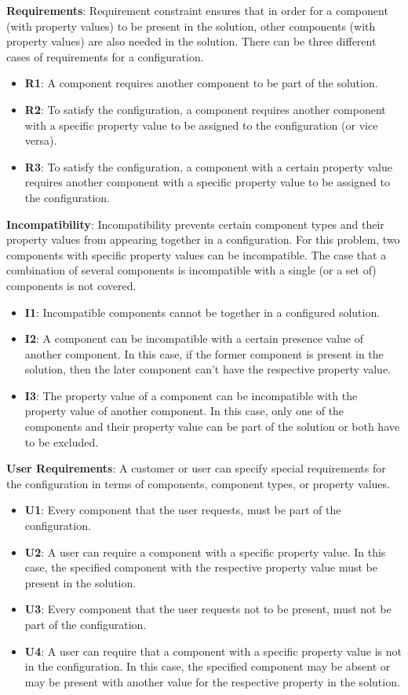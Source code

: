 \noindent \textbf{Requirements}: Requirement constraint ensures that in order for a component (with property values) to be present in the solution, other components (with property values) are also needed in the solution. There can be three different cases of requirements for a configuration.
\begin{itemize}
\item \textbf{R1}: A component requires another component to be part of the solution.
\item \textbf{R2}: To satisfy the configuration, a component requires another component with a specific property value to be assigned to the configuration (or vice versa). 
\item \textbf{R3}: To satisfy the configuration, a component with a certain property value requires another component with a specific property value to be assigned to the configuration. 
\end{itemize}

\noindent \textbf{Incompatibility}: Incompatibility prevents certain component types and their property values from appearing together in a configuration. 
For this problem, two components with specific property values can be incompatible. 
The case that a combination of several components is incompatible with a single (or a set of) components is not covered. 
\begin{itemize}
\item \textbf{I1}: Incompatible components cannot be together in a configured solution. 
\item \textbf{I2}: A component can be incompatible with a certain presence value of another component. In this case, if the former component is present in the solution, then the later component can't have the respective property value. 
\item \textbf{I3}: The property value of a component can be incompatible with the property value of another component. In this case, only one of the components and their property value can be part of the solution or both have to be excluded. 
\end{itemize}

\noindent \textbf{User Requirements}: A customer or user can specify special requirements for the configuration in terms of components, component types, or property values. 
\begin{itemize}
\item \textbf{U1}: Every component that the user requests, must be part of the configuration.
\item \textbf{U2}: A user can require a component with a specific property value. In this case, the specified component with the respective property value must be present in the solution. 
\item \textbf{U3}: Every component that the user requests not to be present, must not be part of the configuration.
\item \textbf{U4}: A user can require that a component with a specific property value is not in the configuration. In this case, the specified component may be absent or may be present with another value for the respective property in the solution. 
\end{itemize}

